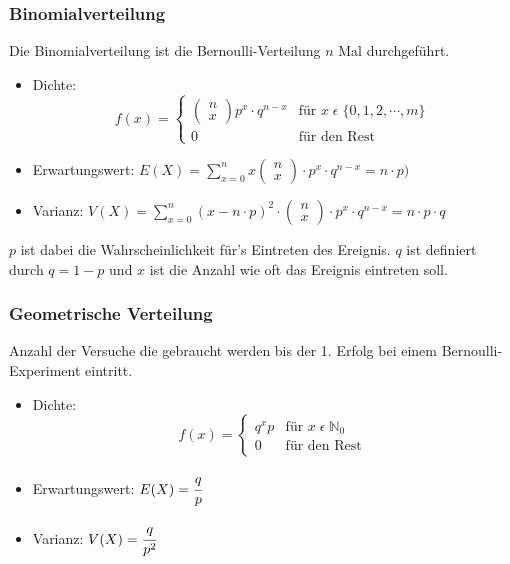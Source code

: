 \documentclass[a4paper]{scrartcl}
\begin{document}
            \subsubsection{Binomialverteilung}
                Die Binomialverteilung ist die Bernoulli-Verteilung \(n\) Mal durchgeführt.
                \begin{itemize}
                    \item Dichte: \[f(x)=
                                                        \begin{cases}
                                                            \begin{pmatrix} n \\ x \end{pmatrix} p^x \cdot q^{n - x} & \text{für } x \; \epsilon \; \{0,1,2,\cdots, m\} \\
                                                            0     & \text{für den Rest} 
                                                        \end{cases}
                                                        \] 
                    \item Erwartungswert: \(E(X) = \sum\limits_{x =0}^n x \begin{pmatrix} n \\ x \end{pmatrix} \cdot p^x \cdot q^{n - x} = n \cdot p ) \)
                    \item Varianz: \(V(X) = \sum\limits_{x=0}^n (x - n \cdot p)^2 \cdot \begin{pmatrix} n \\ x \end{pmatrix} \cdot p^x \cdot q^{n - x} = n \cdot p \cdot q\) 
                \end{itemize}
                \(p\) ist dabei  die Wahrscheinlichkeit für's Eintreten des Ereignis. \(q\) ist definiert durch \(q = 1 - p\) und \(x\) ist die Anzahl wie oft das Ereignis eintreten soll.  
            \subsubsection{Geometrische Verteilung}
            Anzahl der Versuche die gebraucht werden bis der 1. Erfolg bei einem Bernoulli-Experiment eintritt. 
            \begin{itemize}
                \item Dichte: \[f(x)=
                                                    \begin{cases}
                                                        q^xp     & \text{für } x \; \epsilon \; \mathbb{N}_0 \\
                                                        0     & \text{für den Rest} 
                                                    \end{cases}
                                                    \] 
                \item Erwartungswert: \(E(X) = \cfrac{q}{p}\)
                \item Varianz: \(V(X) = \cfrac{q}{p^2}\) 
            \end{itemize}
\end{document}
